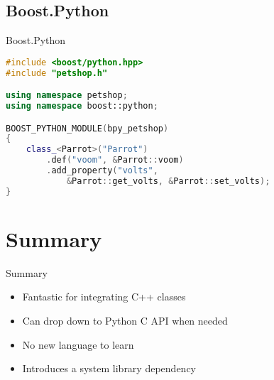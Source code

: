 \documentclass{beamer}
\begin{document}
\subsection{Boost.Python}

\begin{frame}[fragile=singleslide]{Boost.Python}
  \begin{lstlisting}[language=c++]
#include <boost/python.hpp>
#include "petshop.h"

using namespace petshop;
using namespace boost::python;

BOOST_PYTHON_MODULE(bpy_petshop)
{
    class_<Parrot>("Parrot")
        .def("voom", &Parrot::voom)
        .add_property("volts",
            &Parrot::get_volts, &Parrot::set_volts);
}
  \end{lstlisting}
\end{frame}


\section*{Summary}

\begin{frame}{Summary}
  \begin{itemize}
    \item Fantastic for integrating C++ classes
    \item Can drop down to Python C API when needed
    \item No new language to learn
    \item Introduces a system library dependency
  \end{itemize}
\end{frame}
\end{document}
